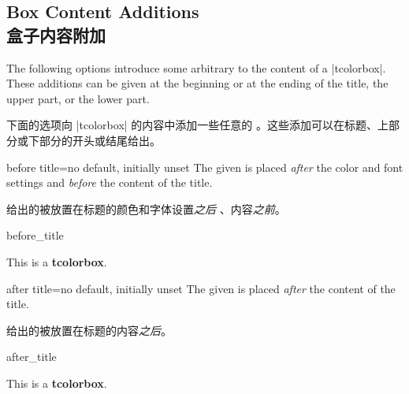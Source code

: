 \subsection{Box Content Additions\\盒子内容附加}\label{subsec:contentadditions}

The following options introduce some arbitrary  to the content
of a |tcolorbox|. These additions can be given at the beginning or at the ending
of the title, the upper part, or the lower part.

下面的选项向 |tcolorbox| 的内容中添加一些任意的 。这些添加可以在标题、上部分或下部分的开头或结尾给出。


\begin{docTcbKey}{before title}{=}{no default, initially unset}
The given  is placed \emph{after} the color and font settings
and \emph{before} the content of the title.

给出的被放置在标题的颜色和字体设置\emph{之后} 、内容\emph{之前}。
\begin{exdispExample}{before_title}

\begin{tcolorbox}[title=My title]
This is a \textbf{tcolorbox}.
\end{tcolorbox}
\end{exdispExample}
\end{docTcbKey}


\begin{docTcbKey}{after title}{=}{no default, initially unset}
The given  is placed \emph{after} the content of the title.

给出的被放置在标题的内容\emph{之后}。
\begin{exdispExample}{after_title}

\begin{tcolorbox}[title=My title]
This is a \textbf{tcolorbox}.
\end{tcolorbox}
\end{exdispExample}
\end{docTcbKey}




